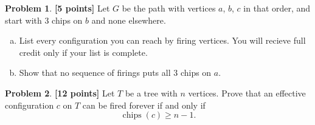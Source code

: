 \documentclass[11pt]{article}
\theoremstyle{definition}
\newtheorem{problem}{Problem}[section]
\newcommand{\pts}[1]{\textbf{[#1 points]}}
\DeclareMathOperator{\chips}{chips}
\begin{document}
\begin{problem} \pts{5}
Let $G$ be the path with vertices $a$, $b$, $c$ in that order, and start with $3$ chips on $b$ and none elsewhere.
\begin{enumerate}[(a)]
  \item List every configuration you can reach by firing vertices. You will recieve full credit only if your list is complete.
  \item Show that no sequence of firings puts all $3$ chips on $a$.
\end{enumerate}
\end{problem}

\begin{problem} \pts{12}
Let $T$ be a tree with $n$ vertices. Prove that an effective configuration $c$ on $T$ can be fired forever if and only if
\[
  \chips(c) \ge n - 1.
\]
\end{problem}
\end{document}
